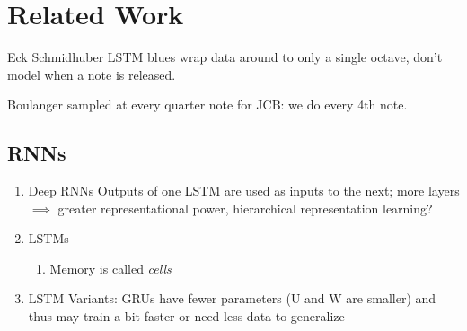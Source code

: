 \chapter{Related Work}





Eck Schmidhuber  LSTM blues wrap data around to only a single octave, don't
model when a note is released.

Boulanger sampled at every quarter note for JCB: we do every 4th note.


\section{RNNs}

\begin{enumerate}
    \item Deep RNNs
        Outputs of one LSTM are used as inputs to the next; more layers $\implies$
        greater representational power, hierarchical representation learning?
    \item LSTMs
        \begin{enumerate}
            \item Memory is called \emph{cells}
        \end{enumerate}

    \item LSTM Variants: GRUs have fewer parameters (U and W are smaller) and
        thus may train a bit faster or need less data to generalize
\end{enumerate}

